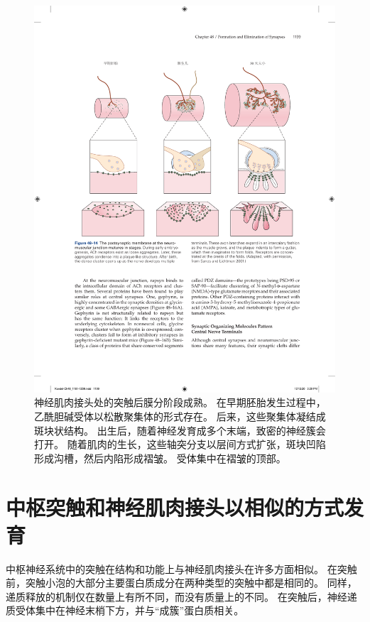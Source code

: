 \begin{figure}[htbp]
	\centering
	\includegraphics[width=1.0\linewidth]{chap48/fig_48_14}
	\caption{神经肌肉接头处的突触后膜分阶段成熟。
		在早期胚胎发生过程中，乙酰胆碱受体以松散聚集体的形式存在。
		后来，这些聚集体凝结成斑块状结构。
		出生后，随着神经发育成多个末端，致密的神经簇会打开。
		随着肌肉的生长，这些轴突分支以层间方式扩张，斑块凹陷形成沟槽，然后内陷形成褶皱。
		受体集中在褶皱的顶部\cite{sanes2001induction}。}
	\label{fig:48_14}
\end{figure}



\section{中枢突触和神经肌肉接头以相似的方式发育}

中枢神经系统中的突触在结构和功能上与神经肌肉接头在许多方面相似。
在突触前，突触小泡的大部分主要蛋白质成分在两种类型的突触中都是相同的。
同样，递质释放的机制仅在数量上有所不同，而没有质量上的不同。
在突触后，神经递质受体集中在神经末梢下方，并与“成簇”蛋白质相关。


